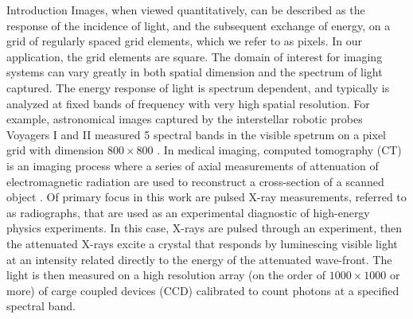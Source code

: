 \begin{chapter}{Introduction}
  Images, when viewed quantitatively, can be described as the response of the incidence of light, and the subsequent exchange of energy, on a grid of regularly spaced grid elements, which we refer to as pixels.
  In our application, the grid elements are square.
  The domain of interest for imaging systems can vary greatly in both spatial dimension and the spectrum of light captured. 
  The energy response of light is spectrum dependent, and typically is analyzed at fixed bands of frequency with very high spatial resolution.
  For example, astronomical images captured by the interstellar robotic probes Voyagers I and II measured 5 spectral bands in the visible spetrum on a pixel grid with dimension $800 \times 800$ \citep{voyager}.
  In medical imaging, computed tomography (CT) is an imaging process where a series of axial measurements of attenuation of electromagnetic radiation are used to reconstruct a cross-section of a scanned object \citep{epstein2008}.
  Of primary focus in this work are pulsed X-ray measurements, referred to as radiographs, that are used as an experimental diagnostic of high-energy physics experiments.  
  In this case, X-rays are pulsed through an experiment, then the attenuated X-rays excite a crystal that responds by luminescing visible light at an intensity related directly to the energy of the attenuated wave-front.  
  The light is then measured on a high resolution array (on the order of $1000\times1000$ or more) of carge coupled devices (CCD) calibrated to count photons at a specified spectral band.


\end{chapter}
